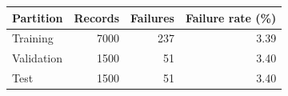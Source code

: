 \begin{tabular}{lrrr}
\toprule
Partition & Records & Failures & Failure rate (\%)\\
\midrule
Training & 7000 & 237 & 3.39\\
Validation & 1500 & 51 & 3.40\\
Test & 1500 & 51 & 3.40\\
\bottomrule
\end{tabular}
